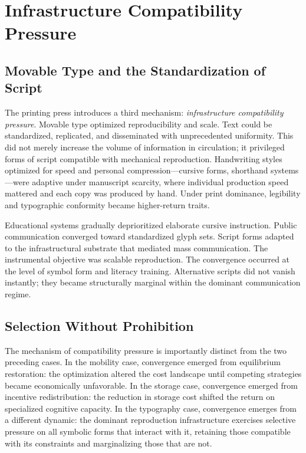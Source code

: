 \documentclass[12pt, oneside]{book}
\theoremstyle{plain}
\theoremstyle{definition}
\theoremstyle{remark}
\theoremstyle{definition}
\begin{document}
\chapter{Infrastructure Compatibility Pressure}
\label{ch:compatibility}

\section{Movable Type and the Standardization of Script}

The printing press introduces a third mechanism: \emph{infrastructure compatibility
pressure}. Movable type optimized reproducibility and scale. Text could be
standardized, replicated, and disseminated with unprecedented uniformity. This did
not merely increase the volume of information in circulation; it privileged forms of
script compatible with mechanical reproduction. Handwriting styles optimized for
speed and personal compression---cursive forms, shorthand systems---were adaptive
under manuscript scarcity, where individual production speed mattered and each copy
was produced by hand. Under print dominance, legibility and typographic conformity
became higher-return traits.

Educational systems gradually deprioritized elaborate cursive instruction. Public
communication converged toward standardized glyph sets. Script forms adapted to the
infrastructural substrate that mediated mass communication. The instrumental objective
was scalable reproduction. The convergence occurred at the level of symbol form and
literacy training. Alternative scripts did not vanish instantly; they became
structurally marginal within the dominant communication regime.

\section{Selection Without Prohibition}

The mechanism of compatibility pressure is importantly distinct from the two preceding
cases. In the mobility case, convergence emerged from equilibrium restoration: the
optimization altered the cost landscape until competing strategies became economically
unfavorable. In the storage case, convergence emerged from incentive redistribution:
the reduction in storage cost shifted the return on specialized cognitive capacity.
In the typography case, convergence emerges from a different dynamic: the dominant
reproduction infrastructure exercises selective pressure on all symbolic forms that
interact with it, retaining those compatible with its constraints and marginalizing
those that are not.
\end{document}
